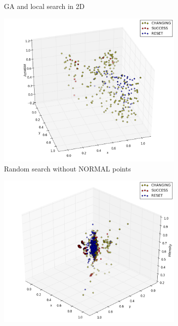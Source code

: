 \documentclass[times, utf8, diplomski]{fer}
\begin{document}
\begin{figure}
\begin{subfigure}[b]{0.49\textwidth}
		\caption{GA and local search in 2D}
		\label{fig:ga1}
	\end{subfigure}
	\begin{subfigure}[b]{0.49\textwidth}
		\centering
		\includegraphics[width=0.98\linewidth]{images/plots/plot_random_3D_nonormal.png}
		\caption{Random search without NORMAL points}
		\label{fig:random2}
	\end{subfigure}		
	\begin{subfigure}[b]{0.49\textwidth}			
		\centering
		\includegraphics[width=0.98\linewidth]{images/plots/plot_GA_3_3D_nonormal.png}

\end{subfigure}
\end{figure}
\end{document}
